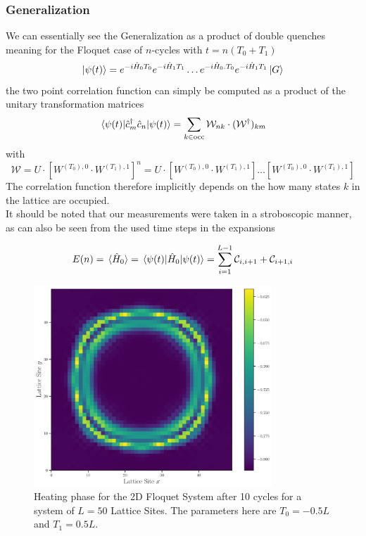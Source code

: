 \documentclass[11pt, a4paper]{article}
\theoremstyle{definition} %
\begin{document}
	\subsubsection{Generalization}
	We can essentially see the Generalization as a product of double quenches meaning for the Floquet case of $n$-cycles with $t = n(T_0 + T_1)$
	\begin{equation}
		\ket{\psi(t)} = e^{-i \hat{H}_0 T_0} e^{-i \hat{H}_1 T_1} \dots e^{-i \hat{H}_0. T_0 } e^{-i \hat{H}_1 T_1} \ket{G}
	\end{equation}
	the two point correlation function can simply be computed as a product of the unitary transformation matrices
	\begin{equation}
		\mel{\psi(t)}{\hat{c}_m^\dagger \hat{c}_n }{\psi(t)} = \sum_{k \in \text{occ}} \mathcal{W}_{nk}  \cdot (\mathcal{W}^\dagger)_{km}
	\end{equation}
	with 
	\begin{equation}
		\mathcal{W} = U \cdot [W^{(T_0),0} \cdot W^{(T_1), 1}]^n = U \cdot [ W^{(T_0),0} \cdot W^{(T_1), 1}] \dots [ W^{(T_0), 0} \cdot W^{(T_1), 1}] 
	\end{equation}
	The correlation function therefore implicitly depends on the how many states $k$ in the lattice are occupied. \\
	
	It should be noted that our measurements were taken in a stroboscopic manner, as can also be seen from the used time steps in the expansions


\begin{equation}
	E(n) =\expval*{\hat{H}_0} = \mel{\psi(t)}{\hat{H}_0}{\psi(t)} = \sum_{i=1}^{L-1} \mathcal{C}_{i, i+1} + \mathcal{C}_{i+1, i}
\end{equation}
	

\begin{figure}[h]
\centering
\includegraphics[width=0.8\textwidth]{Energydensity2d_nearest.pdf}	
\caption{Heating phase for the 2D Floquet System after 10 cycles for a system of $L = 50$ Lattice Sites. The parameters here are $T_0 = -0.5L$ and $T_1 = 0.5L$.}
\end{figure}
\end{document}
